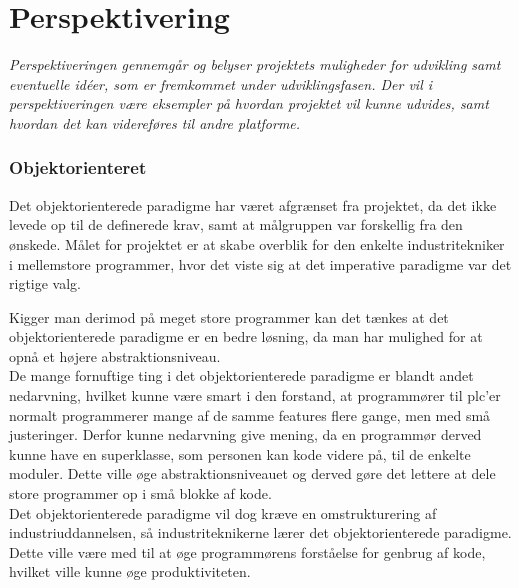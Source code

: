 \chapter{Perspektivering}
\label{sec:Perspektivering}
\textit{Perspektiveringen gennemgår og belyser projektets muligheder for udvikling samt eventuelle idéer, som er fremkommet under udviklingsfasen. Der vil i perspektiveringen være eksempler på hvordan projektet vil kunne udvides, samt hvordan det kan videreføres til andre platforme.}

\subsection*{Objektorienteret}
Det objektorienterede paradigme har været afgrænset fra projektet, da det ikke levede op til de definerede krav, samt at målgruppen var forskellig fra den ønskede.
Målet for projektet er at skabe overblik for den enkelte industritekniker i mellemstore programmer, hvor det viste sig at det imperative paradigme var det rigtige valg.

\noindent Kigger man derimod på meget store programmer kan det tænkes at det objektorienterede paradigme er en bedre løsning, da man har mulighed for at opnå et højere abstraktionsniveau.\\

\noindent De mange fornuftige ting i det objektorienterede paradigme er blandt andet nedarvning, hvilket kunne være smart i den forstand, at programmører til \gls{plc}'er normalt programmerer mange af de samme features flere gange, men med små justeringer.
Derfor kunne nedarvning give mening, da en programmør derved kunne have en superklasse, som personen kan kode videre på, til de enkelte moduler.
Dette ville øge abstraktionsniveauet og derved gøre det lettere at dele store programmer op i små blokke af kode.\\

\noindent Det objektorienterede paradigme vil dog kræve en omstrukturering af industriuddannelsen, så industriteknikerne lærer det objektorienterede paradigme.
Dette ville være med til at øge programmørens forståelse for genbrug af kode, hvilket ville kunne øge produktiviteten.

